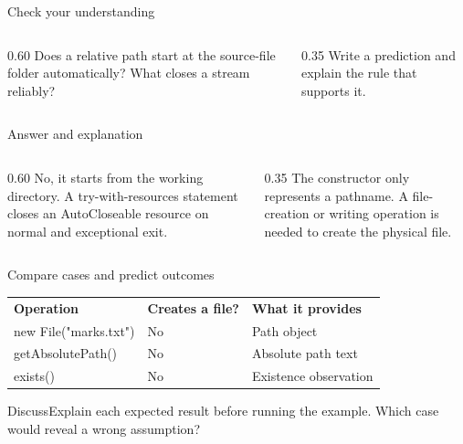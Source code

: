 \documentclass[10pt,aspectratio=169]{beamer}
\begin{document}
\begin{frame}[fragile,t]{Check your understanding}
\begin{columns}[T,onlytextwidth]\begin{column}{0.60\textwidth}
Does a relative path start at the source-file folder automatically? What closes a stream reliably?
\end{column}\begin{column}{0.35\textwidth}\small
Write a prediction and explain the rule that supports it.
\end{column}\end{columns}
\end{frame}

\begin{frame}[fragile,t]{Answer and explanation}
\begin{columns}[T,onlytextwidth]\begin{column}{0.60\textwidth}
No, it starts from the working directory. A try-with-resources statement closes an AutoCloseable resource on normal and exceptional exit.
\end{column}\begin{column}{0.35\textwidth}\small
The constructor only represents a pathname. A file-creation or writing operation is needed to create the physical file.
\end{column}\end{columns}
\end{frame}


\begin{frame}[fragile,t]{Compare cases and predict outcomes}
\small\renewcommand{\arraystretch}{1.5}
\begin{tabularx}{\textwidth}{>{\raggedright\arraybackslash}X>{\raggedright\arraybackslash}X>{\raggedright\arraybackslash}X}\rowcolor{navy}
\color{white}\bfseries Operation & \color{white}\bfseries Creates a file? & \color{white}\bfseries What it provides\\
new File("marks.txt") & No & Path object\\
getAbsolutePath() & No & Absolute path text\\
exists() & No & Existence observation\\
\end{tabularx}\par\vspace{3mm}\begin{exampleblock}{Discuss}Explain each expected result before running the example. Which case would reveal a wrong assumption?\end{exampleblock}
\end{frame}
\end{document}
